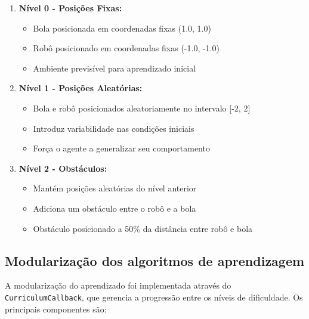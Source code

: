 \begin{enumerate}
    \item \textbf{Nível 0 - Posições Fixas:} 
    \begin{itemize}
        \item Bola posicionada em coordenadas fixas (1.0, 1.0)
        \item Robô posicionado em coordenadas fixas (-1.0, -1.0)
        \item Ambiente previsível para aprendizado inicial
    \end{itemize}

    \item \textbf{Nível 1 - Posições Aleatórias:}
    \begin{itemize}
        \item Bola e robô posicionados aleatoriamente no intervalo [-2, 2]
        \item Introduz variabilidade nas condições iniciais
        \item Força o agente a generalizar seu comportamento
    \end{itemize}

    \item \textbf{Nível 2 - Obstáculos:}
    \begin{itemize}
        \item Mantém posições aleatórias do nível anterior
        \item Adiciona um obstáculo entre o robô e a bola
        \item Obstáculo posicionado a 50\% da distância entre robô e bola
    \end{itemize}
\end{enumerate}

\subsection{Modularização dos algoritmos de aprendizagem}

A modularização do aprendizado foi implementada através do \texttt{CurriculumCallback}, que gerencia a progressão entre os níveis de dificuldade. Os principais componentes são:

